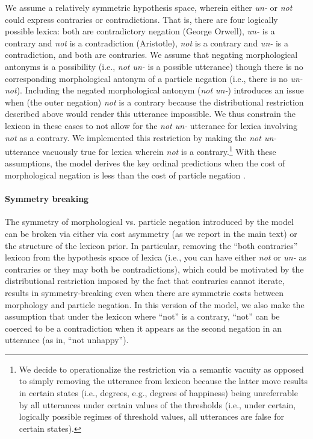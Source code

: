 \documentclass[floatsintext,doc]{apa6}
\let\oldparagraph\paragraph
\renewcommand{\paragraph}[1]{\oldparagraph{#1}\mbox{}}
\let\rmarkdownfootnote\footnote%
\def\footnote{\protect\rmarkdownfootnote}
\begin{document}
We assume a relatively symmetric hypothesis space, wherein either \emph{un-} or \emph{not} could express contraries or contradictions. 
That is, there are four logically possible lexica: both are contradictory negation (George Orwell), \emph{un-} is a contrary and \emph{not} is a contradiction (Aristotle), \emph{not} is a contrary and \emph{un-} is a contradiction, and both are contraries. 
We assume that negating morphological antonyms is a possibility (i.e., \emph{not un-} is a possible utterance) though there is no corresponding morphological antonym of a particle negation (i.e., there is no \emph{un- not}). 
Including the negated morphological antonym (\emph{not un-}) introduces an issue when (the outer negation) \emph{not} is a contrary because the distributional restriction described above would render this utterance impossible. 
We thus constrain the lexicon in these cases to not allow for the \emph{not un-} utterance for lexica involving \emph{not} as a contrary. 
We implemented this restriction by making the \emph{not un-} utterance vacuously true for lexica wherein \emph{not} is a contrary.\footnote{We decide to operationalize the restriction via a semantic vacuity as opposed to simply removing the utterance from lexicon because the latter move results in certain states (i.e., degrees, e.g., degrees of happiness) being unreferrable by all utterances under certain values of the thresholds (i.e., under certain, logically possible regimes of threshold values, all utterances are false for certain states). }
With these assumptions, the model derives the key ordinal predictions when the cost of morphological negation is less than the cost of particle negation .

\paragraph{Symmetry breaking}
%
The symmetry of morphological vs. particle negation introduced by the \ourmodel model can be broken via either via cost asymmetry (as we report in the main text) or the structure of the lexicon prior. 
In particular, removing the ``both contraries'' lexicon from the hypothesis space of lexica (i.e., you can have either \emph{not} or \emph{un-} as contraries or they may both be contradictions), which could be motivated by the distributional restriction imposed by the fact that contraries cannot iterate, results in symmetry-breaking even when there are symmetric costs between morphology and particle negation. 
In this version of the model, we also make the assumption that under the lexicon where ``not'' is a contrary, ``not'' can be coerced to be a contradiction when it appears as the second negation in an utterance (as in, ``not unhappy''). 
\end{document}
